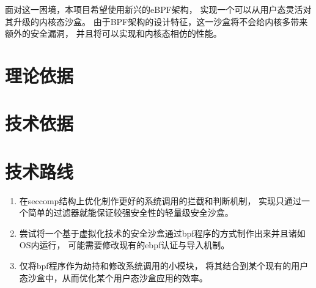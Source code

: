 \documentclass[AutoFakeBold,a4paper]{ctexart}
\begin{document}
面对这一困境，本项目希望使用新兴的eBPF架构，
实现一个可以从用户态灵活对其升级的内核态沙盒。
由于BPF架构的设计特征，这一沙盒将不会给内核多带来额外的安全漏洞，
并且将可以实现和内核态相仿的性能。

\section{理论依据}


\section{技术依据}

\section{技术路线}

\begin{enumerate}
    \item 在seccomp结构上优化制作更好的系统调用的拦截和判断机制，
    实现只通过一个简单的过滤器就能保证较强安全性的轻量级安全沙盒。
    \item 尝试将一个基于虚拟化技术的安全沙盒通过bpf程序的方式制作出来并且诸如OS内运行，
    可能需要修改现有的ebpf认证与导入机制。
    \item 仅将bpf程序作为劫持和修改系统调用的小模块，
    将其结合到某个现有的用户态沙盒中，从而优化某个用户态沙盒应用的效率。
\end{enumerate}



\end{document}
